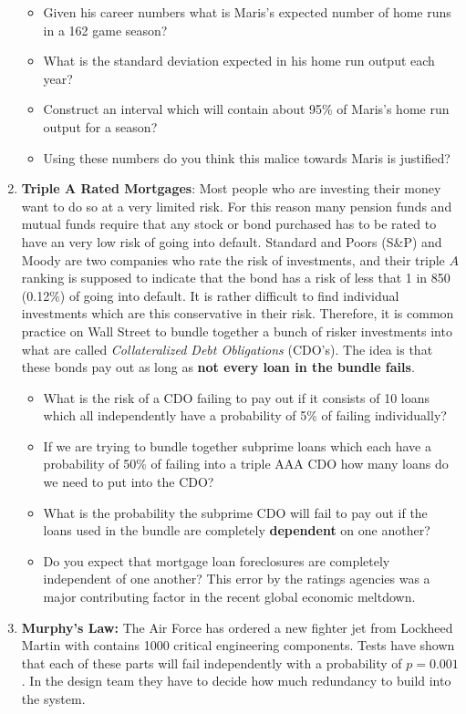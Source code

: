 \documentclass[
]{book}
\providecommand{\tightlist}{%
  \setlength{\itemsep}{0pt}\setlength{\parskip}{0pt}}
\theoremstyle{definition}
\theoremstyle{definition}
\theoremstyle{definition}
\theoremstyle{definition}
\theoremstyle{remark}
\begin{document}
\begin{enumerate}
  \begin{itemize}
  \tightlist
  \item
    Given his career numbers what is Maris's expected number of home runs in a 162 game season?
  \item
    What is the standard deviation expected in his home run output each year?
  \item
    Construct an interval which will contain about 95\% of Maris's home run output for a season?
  \item
    Using these numbers do you think this malice towards Maris is justified?
  \end{itemize}
\item
  \textbf{Triple A Rated Mortgages}: Most people who are investing their money want to do so at a very limited risk. For this reason many pension funds and mutual funds require that any stock or bond purchased has to be rated to have an very low risk of going into default. Standard and Poors (S\&P) and Moody are two companies who rate the risk of investments, and their triple \(A\) ranking is supposed to indicate that the bond has a risk of less that 1 in 850 (0.12\%) of going into default.
  It is rather difficult to find individual investments which are this conservative in their risk. Therefore, it is common practice on Wall Street to bundle together a bunch of risker investments into what are called \emph{Collateralized Debt Obligations} (CDO's). The idea is that these bonds pay out as long as \textbf{not every loan in the bundle fails}.

  \begin{itemize}
  \tightlist
  \item
    What is the risk of a CDO failing to pay out if it consists of 10 loans which all independently have a probability of 5\% of failing individually?
  \item
    If we are trying to bundle together subprime loans which each have a probability of 50\% of failing into a triple AAA CDO how many loans do we need to put into the CDO?
  \item
    What is the probability the subprime CDO will fail to pay out if the loans used in the bundle are completely \textbf{dependent} on one another?
  \item
    Do you expect that mortgage loan foreclosures are completely independent of one another? This error by the ratings agencies was a major contributing factor in the recent global economic meltdown.
  \end{itemize}
\item
  \textbf{Murphy's Law:} The Air Force has ordered a new fighter jet from Lockheed Martin with contains 1000 critical engineering components. Tests have shown that each of these parts will fail independently with a probability of \(p=0.001\). In the design team they have to decide how much redundancy to build into the system.


\end{enumerate}
\end{document}
